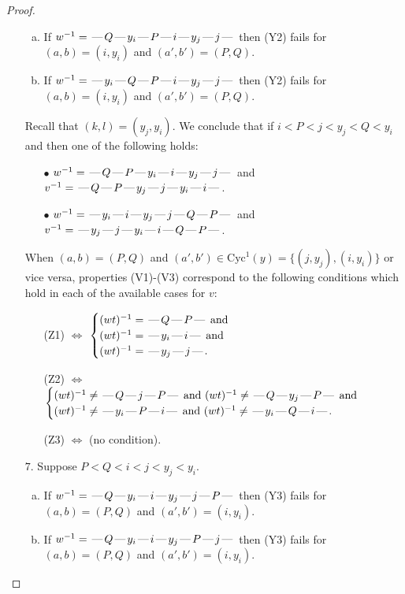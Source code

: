 \documentclass[10pt]{article}
\theoremstyle{definition}
\theoremstyle{definition}
\def\dash{\text{\hspace{0.5mm}---\hspace{0.5mm}}}
\def\Cyc{\mathrm{Cyc}}
\begin{document}
\begin{proof}
\begin{enumerate}
\begin{enumerate}[(a)]
\item If $w^{-1} = \dash Q\dash y_i\dash P\dash i\dash y_j\dash j\dash $ then (Y2) fails for $(a,b)=(i,y_i)$ and $(a',b')=(P,Q)$.
\item If $w^{-1} = \dash y_i\dash Q\dash P\dash i\dash y_j\dash j\dash $ then (Y2) fails for $(a,b)=(i,y_i)$ and $(a',b')=(P,Q)$.
\end{enumerate}
Recall that $(k,l) = (y_j,y_i)$.
We conclude that if $i < P < j < y_j < Q < y_i$ and then one of the following holds:
\begin{enumerate}
\item[$\bullet$] $w^{-1} = \dash Q\dash P\dash y_i\dash i\dash y_j\dash j\dash $ and $v^{-1} = \dash Q\dash P\dash y_j\dash j\dash y_i\dash i\dash $.
\item[$\bullet$] $w^{-1} = \dash y_i\dash i\dash y_j\dash j\dash Q\dash P\dash $ and $v^{-1} = \dash y_j\dash j\dash y_i\dash i\dash Q\dash P\dash $.
\end{enumerate}
When $(a,b)= (P,Q)$ and $(a',b')\in \Cyc^1(y)=\{(j,y_j),(i,y_i)\}$ or vice versa,
properties (V1)-(V3) correspond to the following conditions which hold in
each of the available cases for $v$:
\begin{enumerate}
\item[](Z1) $\Leftrightarrow$ $\begin{cases}\text{$(wt)^{-1} = \dash Q \dash P \dash$}\text{ and }\\
\text{$(wt)^{-1} = \dash y_i \dash i \dash$}\text{ and }\\
\text{$(wt)^{-1} = \dash y_j \dash j \dash$}.\end{cases}$
\item[](Z2) $\Leftrightarrow$ $\begin{cases}\text{$(wt)^{-1} \neq \dash Q \dash j \dash P \dash$ and $(wt)^{-1}\neq \dash Q \dash y_j \dash P \dash$}\text{ and }\\
\text{$(wt)^{-1} \neq \dash y_i \dash P \dash i \dash$ and $(wt)^{-1}\neq \dash y_i \dash Q \dash i \dash$}.\end{cases}$
\item[](Z3) $\Leftrightarrow$ (no condition).
\end{enumerate}
\item[$7$.] Suppose $P < Q < i < j < y_j < y_i$.
\begin{enumerate}[(a)]
\item If $w^{-1} = \dash Q\dash y_i\dash i\dash y_j\dash j\dash P\dash $ then (Y3) fails for $(a,b)=(P,Q)$ and $(a',b')=(i,y_i)$.
\item If $w^{-1} = \dash Q\dash y_i\dash i\dash y_j\dash P\dash j\dash $ then (Y3) fails for $(a,b)=(P,Q)$ and $(a',b')=(i,y_i)$.

\end{enumerate}
\end{enumerate}
\end{proof}
\end{document}
